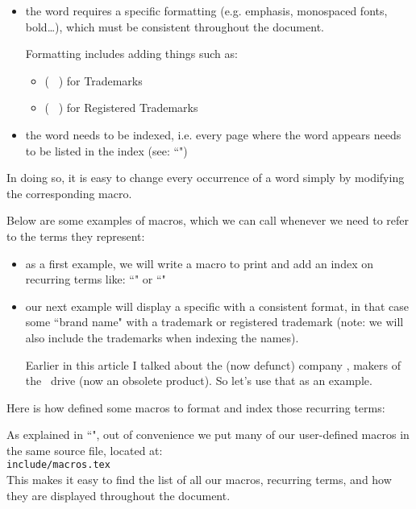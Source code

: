 \begin{itemize}
	\item the word requires a specific formatting (e.g. emphasis, monospaced fonts, bold\dots), which must be consistent throughout the document.
	
	Formatting includes adding things such as:
	\begin{itemize}
		\item {}  ( \texttrademark\  ) for Trademarks
		\item {} ( \textregistered\ ) for Registered Trademarks
	\end{itemize}

	\item the word needs to be indexed, i.e. every page where the word appears needs to be listed in the index (see: ``")
\end{itemize}

In doing so, it is easy to change every occurrence of a word simply by modifying the corresponding macro. \\

\bigskip

Below are some examples of macros, which we can call whenever we need to refer to the terms they represent:

\begin{itemize}
	\item as a first example, we will write a macro to print and add an index on recurring terms like: ``\TeXstudio" or ``\WYSIWYG"
	\item our next example will display a specific with a consistent format, in that case some ``brand name" with a trademark or registered trademark (note: we will also include the trademarks when indexing the names).
	
	Earlier in this article I talked about the (now defunct) company \Iomega, makers of the \Zip\ drive (now an obsolete product). So let's use that as an example.
\end{itemize}


Here is how defined some macros to format and index those recurring terms:





\begin{note}
As explained in ``", out of convenience we put many of our user-defined macros in the same source file, located at: \\ \texttt{include/macros.tex} \\

This makes it easy to find the list of all our macros, recurring terms, and how they are displayed throughout the document.
\end{note}

